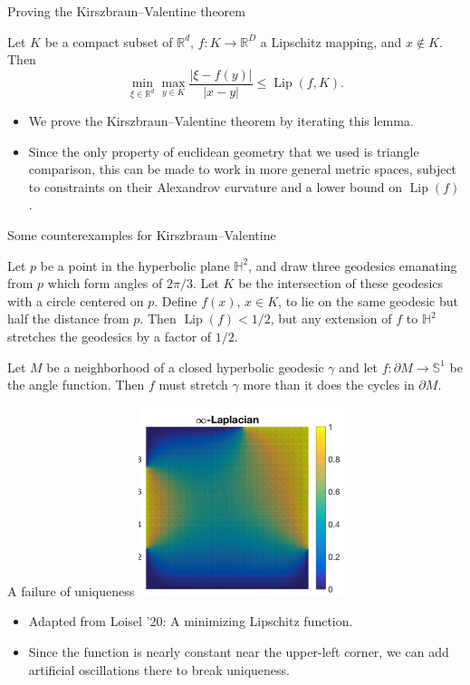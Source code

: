 \documentclass[10pt]{beamer}
\newcommand{\RR}{\mathbb{R}}
\DeclareMathOperator{\Lip}{Lip}
\begin{document}
\begin{frame}{Proving the Kirszbraun--Valentine theorem}
\begin{lemma}
Let $K$ be a compact subset of $\RR^d$, $f: K \to \RR^D$ a Lipschitz mapping, and $x \notin K$.
Then
$$\min_{\xi \in \RR^d} \max_{y \in K} \frac{|\xi - f(y)|}{|x - y|} \leq \Lip(f, K).$$
\end{lemma} 

\begin{itemize}
\item We prove the Kirszbraun--Valentine theorem by iterating this lemma. 
\item Since the only property of euclidean geometry that we used is triangle comparison, this can be made to work in more general metric spaces, subject to constraints on their Alexandrov curvature and a lower bound on $\Lip(f)$.
\end{itemize}
\end{frame}

\begin{frame}{Some counterexamples for Kirszbraun--Valentine}
\begin{example}
Let $p$ be a point in the hyperbolic plane $\mathbb H^2$, and draw three geodesics emanating from $p$ which form angles of $2\pi/3$.
Let $K$ be the intersection of these geodesics with a circle centered on $p$.
Define $f(x)$, $x \in K$, to lie on the same geodesic but half the distance from $p$.
Then $\Lip(f) < 1/2$, but any extension of $f$ to $\mathbb H^2$ stretches the geodesics by a factor of $1/2$.
\end{example}

\begin{example}
Let $M$ be a neighborhood of a closed hyperbolic geodesic $\gamma$ and let $f: \partial M \to \mathbb S^1$ be the angle function.
Then $f$ must stretch $\gamma$ more than it does the cycles in $\partial M$.
\end{example}
\end{frame}

\begin{frame}{A failure of uniqueness}
    \centering 
    \includegraphics[width=6cm]{KirszbraunValentine.png}
    
\begin{itemize}
\item Adapted from Loisel '20: A minimizing Lipschitz function.  
\item Since the function is nearly constant near the upper-left corner, we can add artificial oscillations there to break uniqueness.
\end{itemize}
\end{frame}
\end{document}
